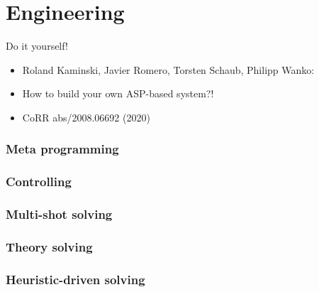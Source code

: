 \part{Engineering}
\begin{frame}{Do it yourself!}
  \bigskip
  \begin{itemize}
  \item Roland Kaminski, Javier Romero, Torsten Schaub, Philipp Wanko:
  \item [] \alert{How to build your own ASP-based system?!}
  \item [] CoRR abs/2008.06692 (2020)
  \end{itemize}
\end{frame}
\section{Meta programming}

\section{Controlling}

\section{Multi-shot solving}

\section{Theory solving}

\section{Heuristic-driven solving}

%
